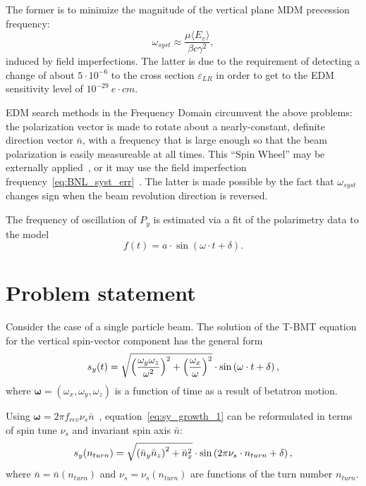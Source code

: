 \documentclass[a4paper]{jacow}
\renewcommand{\vec}{\boldsymbol}
\newcommand{\w}{\omega}
\newcommand{\avg}[1]{\langle {#1} \rangle}
\newcommand{\nbar}{\bar n}
\begin{document}
The former is to minimize the magnitude of
the vertical plane MDM precession frequency:~\cite[p.~11]{BNL:Deuteron2008}
\begin{equation}\label{eq:BNL_syst_err}
\w_{syst} \approx \frac{\mu\avg{E_v}}{\beta c\gamma^2},
\end{equation}
induced by field imperfections. The latter is due to the requirement of detecting a change of about
$5\cdot 10^{-6}$ to the cross section $\varepsilon_{LR}$ in order to get to the EDM sensitivity level
of $10^{-29}~e\cdot cm$.~\cite[p.~18]{BNL:Deuteron2008}

EDM search methods in the Frequency Domain circumvent the above problems: the polarization vector is made to
rotate about a nearly-constant, definite direction vector $\nbar$, with a frequency that is large enough so that
the beam polarization is easily measureable at all times. This ``Spin Wheel'' may be
externally applied~\cite{Koop:SW}, or it may use the
field imperfection frequency~\eqref{eq:BNL_syst_err}~\cite{Senichev:FDM}. The latter is made possible by the fact
that $\w_{syst}$ changes sign when the beam revolution direction is reversed.~\cite[p.~11]{BNL:Deuteron2008}

The frequency of oscillation of $P_y$ is estimated via a fit of the polarimetry data to the model
\begin{equation}\label{eq:fit_model}
  f(t) = a\cdot\sin(\w\cdot t + \delta).
\end{equation}

\section{Problem statement}
\newcommand{\ntrn}{n_{turn}}
Consider the case of a single particle beam. The solution of the T-BMT equation for the
vertical spin-vector component has the general form
\begin{equation}\label{eq:sy_growth_1}
  s_y(t) = \sqrt{\bkt{\frac{\w_y\w_z}{\w^2}}^2 + \bkt{\frac{\w_x}{\w}}^2}\cdot\sin\bkt{\w\cdot t + \delta},
\end{equation}
where $\vec\w = (\w_x, \w_y, \w_z)$ is a function of time as a result of betatron motion.

Using $\vec\w = 2\pi f_{rev}\nu_s\nbar$~\cite[p.~4]{COSY:SpinTuneMapping}, equation~\eqref{eq:sy_growth_1}
can be reformulated in terms of spin tune $\nu_s$ and invariant spin axis $\bar n$:
\begin{equation}\label{eq:main}
  s_y(n_{turn}) = \sqrt{\bkt{\nbar_y\nbar_z}^2 + \nbar_x^2}\cdot\sin\bkt{2\pi\nu_s\cdot\ntrn + \delta},
\end{equation}
where $\nbar = \nbar(\ntrn)$ and $\nu_s = \nu_s(\ntrn)$ are functions of the turn number $\ntrn$.
\end{document}
